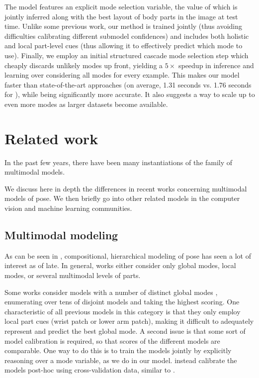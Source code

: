 The model features an explicit mode selection variable, the value of which is 
jointly inferred along with the best layout of body parts in the image at test 
time.  Unlike some previous work, our method is trained jointly (thus avoiding 
difficulties calibrating different submodel confidences) and includes both 
holistic and local part-level cues (thus allowing it to effectively predict 
which mode to use).  Finally, we employ an initial structured cascade mode 
selection step which cheaply discards unlikely modes up front, yielding a 
$5\times$ speedup in inference and learning over considering all modes for 
every example.  This makes our model faster than state-of-the-art approaches 
(on average, 1.31 seconds vs. 1.76 seconds for \citet{deva2011}), while being 
significantly more accurate.  It also suggests a way to scale up to even more 
modes as larger datasets become available.
 

\section{Related work}\label{sec:llps-rel}
 \begin{table}[bt!]
\begin{center}
{\small

}
\caption[Family of multimodal pose models.]{In the past few years, there have 
been many instantiations of the family of multimodal models. }
\label{tab:rel-work-ps} \end{center}
\end{table}

We discuss here in depth the differences in recent works concerning multimodal 
models of pose.  We then briefly go into other related models in the computer 
vision and machine learning communities.

\subsection{Multimodal modeling}
As can be seen in , compositional, hierarchical modeling of 
pose has seen a lot of interest as of late.  In general, works either consider 
only global modes, local modes, or several multimodal levels of parts.

 Some works consider models with a number 
of distinct global modes \citep{everingham2011,ramanan-faces,wang2008multiple}, 
enumerating over tens of disjoint models and taking the highest scoring.  One 
characteristic of all previous models in this category is that they only employ 
local part cues (\eg wrist patch or lower arm patch), making it difficult to 
adequately represent and predict the best global mode.  A second issue is that 
some sort of model calibration is required, so that scores of the different 
models are comparable.  One way to do this is to train the models jointly by 
explicitly reasoning over a mode variable, as we do in our model.  
\citet{everingham2011} instead calibrate the models post-hoc using 
cross-validation data, similar to \citet{esvm}.

